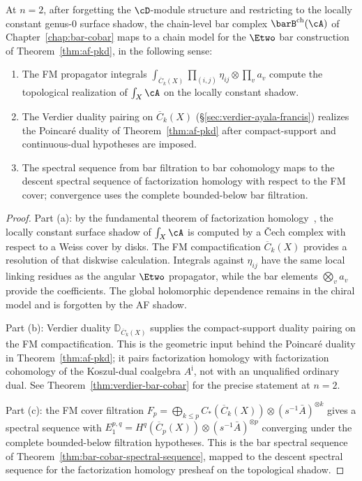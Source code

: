 \begin{proposition}[Chiral chain model over the AF \texorpdfstring{$n = 2$}{n = 2} shadow;
\ClaimStatusConditional]
\label{prop:refines-af}
At $n = 2$, after forgetting the $\cD$-module structure and
restricting to the locally constant genus-$0$ surface shadow, the
chain-level bar complex
$\barB^{\mathrm{ch}}(\cA)$ of
Chapter~\textup{\ref{chap:bar-cobar}} maps to a chain model for the
$\Etwo$ bar construction of
Theorem~\textup{\ref{thm:af-pkd}}, in the following sense:
\begin{enumerate}[label=\textup{(\alph*)}]
\item The FM propagator integrals
 $\int_{\overline{C}_k(X)} \prod_{(i,j)} \eta_{ij}
 \otimes \prod_v a_v$
 compute the topological realization of $\int_X \cA$ on the
 locally constant shadow.
\item The Verdier duality pairing on $\overline{C}_k(X)$
 \textup{(}\S\textup{\ref{sec:verdier-ayala-francis})} realizes the
 Poincar\'e duality of Theorem~\textup{\ref{thm:af-pkd}} after
 compact-support and continuous-dual hypotheses are imposed.
\item The spectral sequence from bar filtration to bar cohomology
 maps to the descent spectral sequence of factorization homology
 with respect to the FM cover; convergence uses the complete
 bounded-below bar filtration.
\end{enumerate}
\end{proposition}

\begin{proof}
Part (a): by the fundamental theorem of factorization
homology~\cite{AF15}, the locally constant surface shadow of
$\int_X \cA$ is computed by a \v{C}ech complex with respect to a
Weiss cover by disks. The FM compactification $\overline{C}_k(X)$
provides a resolution of that diskwise calculation. Integrals against
$\eta_{ij}$ have the same local linking residues as the angular
$\Etwo$ propagator, while the bar elements $\bigotimes_v a_v$ provide
the coefficients. The global holomorphic dependence remains in the
chiral model and is forgotten by the AF shadow.

Part (b): Verdier duality $\mathbb{D}_{\overline{C}_k(X)}$ supplies
the compact-support duality pairing on the FM compactification. This
is the geometric input behind the Poincar\'e duality in
Theorem~\ref{thm:af-pkd}; it pairs factorization homology with
factorization cohomology of the Koszul-dual coalgebra
$A^{\mathrm{i}}$, not with an unqualified ordinary dual. See
Theorem~\ref{thm:verdier-bar-cobar} for the precise statement
at $n = 2$.

Part (c): the FM cover filtration
$F_p = \bigoplus_{k \leq p} C_*(\overline{C}_k(X))
\otimes (s^{-1} \bar{A})^{\otimes k}$
gives a spectral sequence with
$E_1^{p,q} = H^q(\overline{C}_p(X)) \otimes (s^{-1}\bar{A})^{\otimes p}$
converging under the complete bounded-below filtration hypotheses.
This is the bar spectral sequence of
Theorem~\ref{thm:bar-cobar-spectral-sequence}, mapped to the descent
spectral sequence for the factorization homology presheaf on the
topological shadow.
\end{proof}



